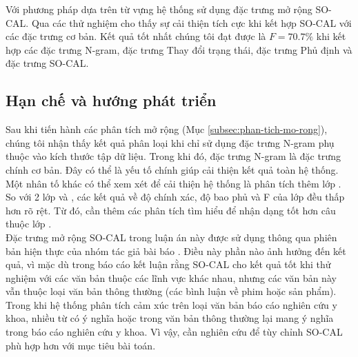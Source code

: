 Với phương pháp dựa trên từ vựng hệ thống sử dụng đặc trưng mở rộng SO-CAL. Qua các thử nghiệm cho thấy sự cải thiện tích cực khi kết hợp SO-CAL với các đặc trưng cơ bản. Kết quả tốt nhất chúng tôi đạt được là $F=70.7\%$ khi kết hợp các đặc trưng N-gram, đặc trưng Thay đổi trạng thái, đặc trưng Phủ định và đặc trưng SO-CAL.
\subsection{Hạn chế và hướng phát triển}
Sau khi tiến hành các phân tích mở rộng (Mục \ref{subsec:phan-tich-mo-rong}), chúng tôi nhận thấy kết quả phân loại khi chỉ sử dụng đặc trưng N-gram phụ thuộc vào kích thước tập dữ liệu. Trong khi đó, đặc trưng N-gram là đặc trưng chính cơ bản. Đây có thể là yếu tố chính giúp cải thiện kết quả toàn hệ thống. \\

Một nhân tố khác có thể xem xét để cải thiện hệ thống là phân tích thêm lớp \tieucuc. So với 2 lớp \tichcuc và \trungtinh, các kết quả về độ chính xác, độ bao phủ và F của lớp \tieucuc đều thấp hơn rõ rệt. Từ đó, cần thêm các phân tích tìm hiểu để nhận dạng tốt hơn câu thuộc lớp \tieucuc.\\

Đặc trưng mở rộng SO-CAL trong luận án này được sử dụng thông qua phiên bản hiện thực của nhóm tác giả bài báo \cite{taboada2011lexicon}. Điều này phần nào ảnh hưởng đến kết quả, vì mặc dù trong báo cáo \cite{taboada2011lexicon} kết luận rằng SO-CAL cho kết quả tốt khi thử nghiệm với các văn bản thuộc các lĩnh vực khác nhau, nhưng các văn bản này vẫn thuộc loại văn bản thông thường (các bình luận về phim hoặc sản phẩm). Trong khi hệ thống phân tích cảm xúc trên loại văn bản báo cáo nghiên cứu y khoa, nhiều từ có ý nghĩa \tieucuc hoặc \trungtinh trong văn bản thông thường lại mang ý nghĩa \tichcuc trong báo cáo nghiên cứu y khoa. Vì vậy, cần nghiên cứu để tùy chỉnh SO-CAL phù hợp hơn với mục tiêu bài toán.